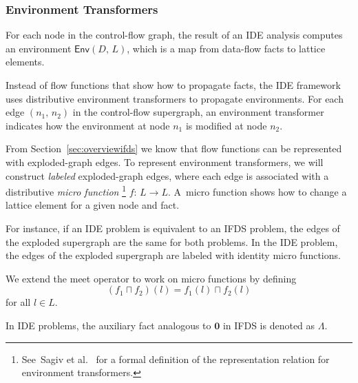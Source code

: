 \subsubsection{Environment Transformers}
For each node in the control-flow graph, the result of an IDE analysis computes an environment $\textsf{Env}(D,\,L)$, which is a map from data-flow facts to lattice elements.

Instead of flow functions that show how to propagate facts, the IDE framework uses distributive environment transformers to propagate environments. For each edge $(n_1,\,n_2)$ in the control-flow supergraph, an environment transformer indicates how the environment at node $n_1$ is modified at node $n_2$.

From Section~\ref{sec:overviewifds} we know that flow functions can be represented with exploded-graph edges. To represent environment transformers, we will construct \textit{labeled} exploded-graph edges, where each edge is associated with a distributive \textit{micro function}%
\footnote{See~Sagiv et al.~\cite{sagiv1996precise} for a formal definition of the representation relation for environment transformers.}
$f:\,L\to L$. A~micro function shows how to change a lattice element for a given node and fact.

For instance, if an IDE problem is equivalent to an IFDS problem, the edges of the exploded supergraph are the same for both problems. In the IDE problem, the edges of the exploded supergraph are labeled with identity micro functions.

We extend the meet operator to work on micro functions by defining
\begin{equation}
  (f_1\sqcap f_2)(l)=f_1(l)\sqcap f_2(l)
\end{equation}
for all $l\in L$.

In IDE problems, the auxiliary fact analogous to $\mathbf0$ in IFDS is denoted as $\Lambda$.


